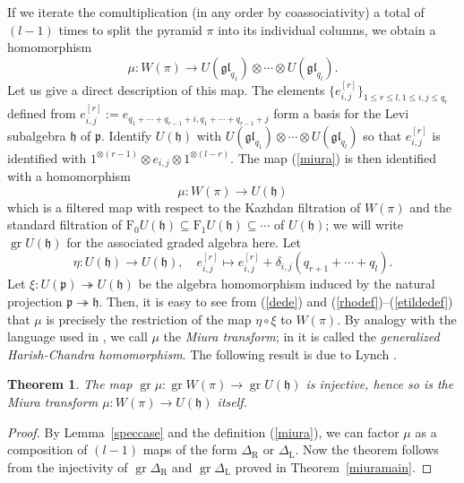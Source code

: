 \documentclass[twoside,12pt,reqno]{amsart}
\newtheorem{Theorem}[Proposition]{Theorem}
\def\rt{{\operatorname{\scriptscriptstyle R}}}
\def\lt{{\operatorname{\scriptscriptstyle L}}}
\def\F{\mathrm{F}}
\def\gr{\operatorname{gr}}
\begin{document}
If we iterate the comultiplication
(in any order by coassociativity) a total of $(l-1)$ times to
split the pyramid $\pi$ into its individual columns, we obtain a 
homomorphism
\begin{equation}\label{miura}
\mu:W(\pi) \rightarrow U(\mathfrak{gl}_{q_1})
\otimes \cdots \otimes U(\mathfrak{gl}_{q_{l}}).
\end{equation}
Let us give a direct description of this map.
The elements
$\{e_{i,j}^{[r]}\}_{1 \leq r \leq l, 1 \leq i,j \leq q_r}$
defined from $e_{i,j}^{[r]} := e_{q_1+\cdots+q_{r-1}+i,q_1+\cdots+q_{r-1}+j}$
form a basis for the Levi subalgebra 
$\mathfrak{h}$ of $\mathfrak{p}$. 
Identify $U(\mathfrak{h})$
with
$U(\mathfrak{gl}_{q_1})
\otimes \cdots \otimes U(\mathfrak{gl}_{q_{l}})$
so that $e_{i,j}^{[r]}$ is identified with
$1^{\otimes (r-1)} \otimes e_{i,j} \otimes 1^{\otimes (l-r)}$.
The map (\ref{miura}) is then identified with a homomorphism
\begin{equation}\label{miura2}
\mu:W(\pi) \rightarrow U(\mathfrak{h})
\end{equation}
which is a filtered map with respect to the
Kazhdan filtration of $W(\pi)$ and the
standard filtration of
$\F_0 U(\mathfrak{h}) \subseteq \F_1 U(\mathfrak{h})
\subseteq \cdots$ of
$U(\mathfrak{h})$; we will write $\gr U(\mathfrak{h})$
for the associated graded algebra here.
Let
\begin{equation}\label{etadef}
\eta:U(\mathfrak{h}) \rightarrow U(\mathfrak{h}),
\quad
e_{i,j}^{[r]} \mapsto e_{i,j}^{[r]} + \delta_{i,j} (q_{r+1}+\cdots
+ q_l).
\end{equation}
Let $\xi:U(\mathfrak{p}) \twoheadrightarrow U(\mathfrak{h})$
be the algebra homomorphism induced by the natural projection
$\mathfrak{p} \twoheadrightarrow \mathfrak{h}$.
Then, it is easy to see from (\ref{dede}) and (\ref{rhodef})--(\ref{etildedef})
that $\mu$ is precisely
the restriction of the map
$\eta\circ\xi$ to $W(\pi)$.
By analogy with the language used in \cite{BT},
we call $\mu$ the {\em Miura transform}; in
\cite{Ly} it is called the {\em generalized Harish-Chandra
homomorphism}.
The following result is due to Lynch \cite[Corollary 2.3.2]{Ly}.

\begin{Theorem}
The map $\gr \mu:\gr W(\pi) \rightarrow
\gr U(\mathfrak{h})$ is injective, hence so is the Miura transform
$\mu:W(\pi) \rightarrow U(\mathfrak{h})$ itself.
\end{Theorem}

\begin{proof}
By Lemma~\ref{speccase} and the definition (\ref{miura}), 
we can factor $\mu$ as a
composition of $(l-1)$ maps of the form $\Delta_\rt$ or $\Delta_\lt$.
Now the theorem follows from
the injectivity of $\gr \Delta_\rt$ and $\gr \Delta_\lt$
proved in Theorem~\ref{miuramain}.
\end{proof}
\end{document}
